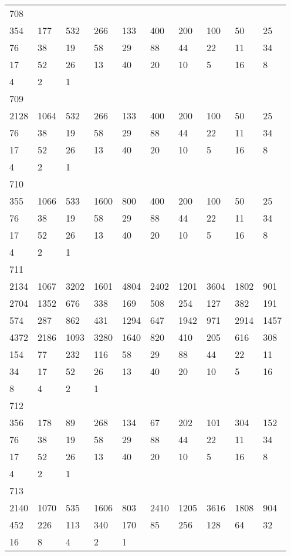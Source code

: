 \begin{longtable}{*{10}{l}}
708&&&&&&&&&\\
354& 177& 532& 266& 133& 400& 200& 100& 50& 25\\
76& 38& 19& 58& 29& 88& 44& 22& 11& 34\\
17& 52& 26& 13& 40& 20& 10& 5& 16& 8\\
4& 2& 1& \\

709&&&&&&&&&\\
2128& 1064& 532& 266& 133& 400& 200& 100& 50& 25\\
76& 38& 19& 58& 29& 88& 44& 22& 11& 34\\
17& 52& 26& 13& 40& 20& 10& 5& 16& 8\\
4& 2& 1& \\

710&&&&&&&&&\\
355& 1066& 533& 1600& 800& 400& 200& 100& 50& 25\\
76& 38& 19& 58& 29& 88& 44& 22& 11& 34\\
17& 52& 26& 13& 40& 20& 10& 5& 16& 8\\
4& 2& 1& \\

711&&&&&&&&&\\
2134& 1067& 3202& 1601& 4804& 2402& 1201& 3604& 1802& 901\\
2704& 1352& 676& 338& 169& 508& 254& 127& 382& 191\\
574& 287& 862& 431& 1294& 647& 1942& 971& 2914& 1457\\
4372& 2186& 1093& 3280& 1640& 820& 410& 205& 616& 308\\
154& 77& 232& 116& 58& 29& 88& 44& 22& 11\\
34& 17& 52& 26& 13& 40& 20& 10& 5& 16\\
8& 4& 2& 1& \\

712&&&&&&&&&\\
356& 178& 89& 268& 134& 67& 202& 101& 304& 152\\
76& 38& 19& 58& 29& 88& 44& 22& 11& 34\\
17& 52& 26& 13& 40& 20& 10& 5& 16& 8\\
4& 2& 1& \\

713&&&&&&&&&\\
2140& 1070& 535& 1606& 803& 2410& 1205& 3616& 1808& 904\\
452& 226& 113& 340& 170& 85& 256& 128& 64& 32\\
16& 8& 4& 2& 1& \\


\end{longtable}
